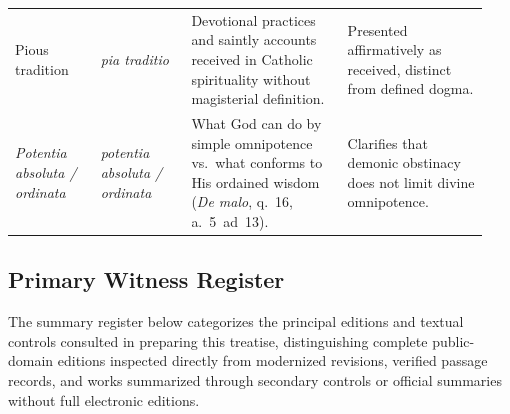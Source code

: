 {\begin{longtable}{>{\bfseries\raggedright\arraybackslash}p{0.17\linewidth}>{\raggedright\arraybackslash}p{0.18\linewidth}>{\raggedright\arraybackslash}p{0.31\linewidth}>{\raggedright\arraybackslash}p{0.28\linewidth}}
\addlinespace[2pt]
Pious tradition & \emph{pia traditio} & Devotional practices and saintly accounts received in Catholic spirituality without magisterial definition. & Presented affirmatively as received, distinct from defined dogma. \\
\addlinespace[2pt]
\emph{Potentia absoluta / ordinata} & \emph{potentia absoluta / ordinata} & What God can do by simple omnipotence vs.\ what conforms to His ordained wisdom (\emph{De malo}, q.~16, a.~5~ad~13). & Clarifies that demonic obstinacy does not limit divine omnipotence. \\
\end{longtable}
}

\subsection{Primary Witness Register}

The summary register below categorizes the principal editions and textual controls consulted in preparing this treatise, distinguishing complete public-domain editions inspected directly from modernized revisions, verified passage records, and works summarized through secondary controls or official summaries without full electronic editions.

